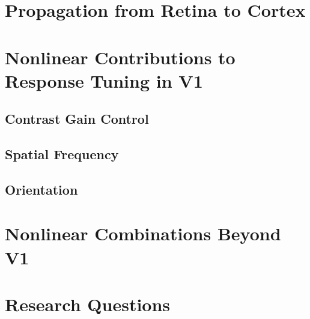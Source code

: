 \section{Propagation from Retina to Cortex}
\section{Nonlinear Contributions to Response Tuning in V1}
	\subsection{Contrast Gain Control}
	\subsection{Spatial Frequency}
	\subsection{Orientation}
\section{Nonlinear Combinations Beyond V1}
\section{Research Questions}

